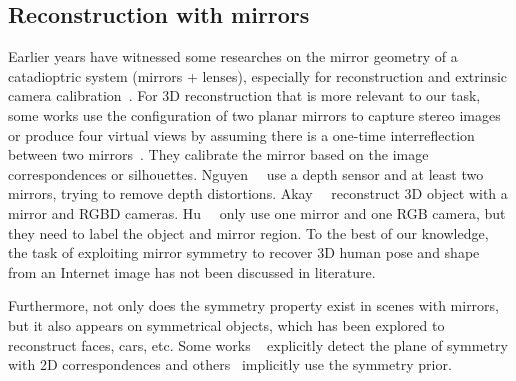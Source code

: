 \subsection{Reconstruction with mirrors}
Earlier years have witnessed some researches on the mirror geometry of a catadioptric system (mirrors + lenses), especially for reconstruction and extrinsic camera calibration~\cite{takahashi2012, rodrigues2010}. For 3D reconstruction that is more relevant to our task, some works use the configuration of two planar mirrors to capture stereo images~\cite{nene1998, gluckman2001catadioptric, tahara2015interference, lanman2009surround} or produce four virtual views by assuming there is a one-time interreflection between two mirrors~\cite{ying2012self}. They calibrate the mirror based on the image correspondences or silhouettes. Nguyen~\etal~\cite{nguyen20183d} use a depth sensor and at least two mirrors, trying to remove depth distortions. Akay~\etal~\cite{akay2014} reconstruct 3D object with a mirror and RGBD cameras. Hu~\etal~\cite{Hu2005MultipleView3R} only use one mirror and one RGB camera, but they need to label the object and mirror region. To the best of our knowledge, the task of exploiting mirror symmetry to recover 3D human pose and shape from an Internet image has not been discussed in literature. 

Furthermore, not only does the symmetry property exist in scenes with mirrors, but it also appears on symmetrical objects, which has been explored to reconstruct faces, cars, etc. Some works ~\cite{sinha2012detecting, jiang2009symmetric} explicitly detect the plane of symmetry with 2D correspondences and others~\cite{Wu_2020_CVPR} implicitly use the symmetry prior.







